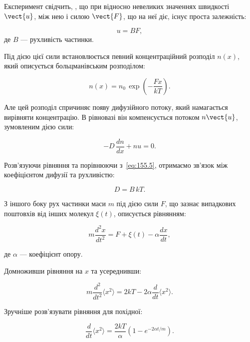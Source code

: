 Експеримент свідчить, , що при відносно невеликих значеннях швидкості $\vect{u}$, між нею і силою $\vect{F}$, що на неї діє, існує проста залежність:

\begin{equation}
	u = B F,
	\label{eq:155.4}
\end{equation}
%
де $B$ --- рухливість частинки.

Під дією цієї сили встановлюється певний концентраційний розподіл $n(x)$, який
описується больцманівським розподілом:

\begin{equation}
	n(x) = n_0\, \exp\!\left(-\frac{F x}{k T}\right).
	\label{eq:155.5}
\end{equation}

Але цей розподіл спричиняє появу дифузійного потоку, який намагається вирівняти
концентрацію. В рівновазі він компенсується потоком $n\vect{u}$, зумовленим дією сили:

\begin{equation}
	- D\, \frac{dn}{dx} + n u = 0.
	\label{eq:155.6}
\end{equation}

Розв’язуючи рівняння та порівнюючи з~\eqref{eq:155.5}, отримаємо зв’язок між
коефіцієнтом дифузії та рухливістю:

\begin{equation}
	D = B\, k T.
	\label{eq:155.7}
\end{equation}

З іншого боку рух частинки маси $m$ під дією сили $F$, що зазнає випадкових
поштовхів від інших молекул $\xi(t)$, описується рівнянням:

\begin{equation}
	m \frac{d^2 x}{dt^2} = F + \xi(t) - \alpha \frac{dx}{dt},
	\label{eq:155.8}
\end{equation}

де $\alpha$ — коефіцієнт опору.

Домноживши рівняння на $x$ та усереднивши:

\begin{equation}
	m \frac{d^2}{dt^2} \langle x^2 \rangle
	= 2 k T - 2 \alpha \frac{d}{dt} \langle x^2 \rangle .
	\label{eq:155.9}
\end{equation}

Зручніше розв’язувати рівняння для похідної:

\begin{equation}
	\frac{d}{dt}\langle x^2 \rangle
	= \frac{2 k T}{\alpha}
	\left(1 - e^{-2\alpha t / m}\right).
	\label{eq:155.10}
\end{equation}

